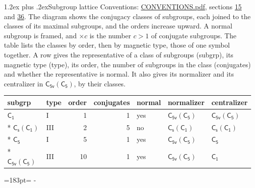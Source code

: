 \documentclass[10pt,a4paper]{article}
\makeatletter
\renewcommand\section{\@startsection{section}{1}{\z@}{-3ex plus -1ex minus -.2ex}%
  {1.2ex plus .2ex}{\normalfont\large\sffamily\bfseries\color{parttitle}}}
\newcommand{\needspace}[1]{\par\penalty-100\begingroup\dimen0=#1\relax\dimen2=\pagegoal
  \advance\dimen2-\pagetotal\ifdim\dimen0>\dimen2\relax\ifdim\dimen2>0pt\vfil\break\fi\fi
  \endgroup}
\numberwithin{equation}{section}
\newcommand{\grp}[1]{\mathsf{#1}}
\newcommand{\nconj}[1]{{\scriptsize$\times#1$}}
\makeatother
\begin{document}
\section{Subgroup lattice}\label{s:subgroups}
Conventions: \href{../../CONVENTIONS.pdf}{CONVENTIONS.pdf}, sections \href{../../../rotation/CONVENTIONS.pdf\#conv.15}{15} and \href{../../CONVENTIONS.pdf\#conv.36}{36}.
The diagram shows the conjugacy classes of subgroups, each joined to the classes of its maximal subgroups, and the orders increase upward. \label{n:index.conjugates.c}\label{n:mark.conjugates}A normal subgroup is framed, and ${\times}c$ is the number $c > 1$ of conjugate subgroups. The table lists the classes by order, then by magnetic type, those of one symbol together. \label{n:head.subgroup}\label{n:head.magnetic.type}\label{n:head.order}\label{n:head.conjugates}\label{n:head.normal}A row gives the representative of a class of subgroups (subgrp), its magnetic type (type), its order, the number of subgroups in the class (conjugates) and whether the representative is normal. \label{n:head.normalizer}\label{n:head.centralizer}It also gives its normalizer and its centralizer in $\grp{C_{5v}}(\grp{C_{5}})$, by their classes. 
\begin{center}
\end{center}
{\small\begin{longtable}{@{}llrrlll@{}}\toprule
subgrp & type & order & conjugates & normal & normalizer & centralizer\\\midrule\endhead
\bottomrule\endfoot\endlastfoot
\href{../../../rotation/data/pdf/C1.pdf}{$\grp{C_{1}}$} & I & 1 & 1 & yes & \href{C5v-C5.pdf}{$\grp{C_{5v}}(\grp{C_{5}})$} & \href{C5v-C5.pdf}{$\grp{C_{5v}}(\grp{C_{5}})$}\\*
\href{C1v-C1.pdf}{$\grp{C_{s}}(\grp{C_{1}})$} & III & 2 & 5 & no & \href{C1v-C1.pdf}{$\grp{C_{s}}(\grp{C_{1}})$} & \href{C1v-C1.pdf}{$\grp{C_{s}}(\grp{C_{1}})$}\\*
\href{../../../rotation/data/pdf/C5.pdf}{$\grp{C_{5}}$} & I & 5 & 1 & yes & \href{C5v-C5.pdf}{$\grp{C_{5v}}(\grp{C_{5}})$} & \href{../../../rotation/data/pdf/C5.pdf}{$\grp{C_{5}}$}\\*
\href{C5v-C5.pdf}{$\grp{C_{5v}}(\grp{C_{5}})$} & III & 10 & 1 & yes & \href{C5v-C5.pdf}{$\grp{C_{5v}}(\grp{C_{5}})$} & \href{../../../rotation/data/pdf/C1.pdf}{$\grp{C_{1}}$}\\
\bottomrule\end{longtable}}
\needspace{183pt}
\end{document}
